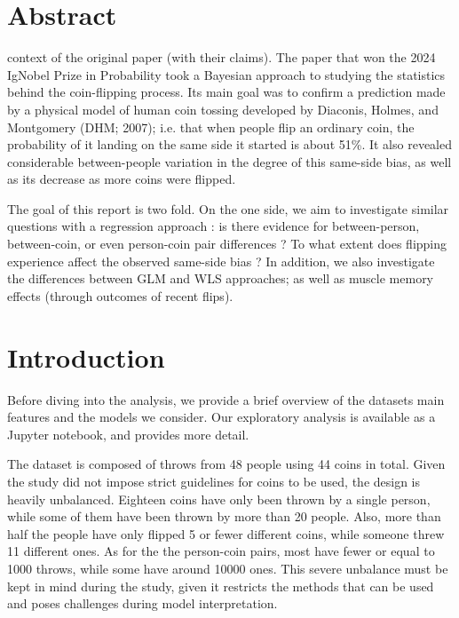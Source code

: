 \documentclass[a4paper, 12pt,oneside]{article}
\begin{document}
 
	 
	\clearpage
	\tableofcontents
	\thispagestyle{empty}
	\vspace{2cm}
	\section*{Abstract}
		context of the original paper (with their claims). The paper that won the 2024 IgNobel Prize in Probability took a Bayesian approach to studying the statistics behind the coin-flipping process. Its main goal was to confirm a prediction made by a physical model of human coin tossing developed by Diaconis, Holmes, and Montgomery (DHM; 2007); i.e. that when people flip an ordinary coin, the probability of it landing on the same side it started is about 51\%. 
		It also revealed considerable between-people variation in the degree of this same-side bias, as well as its decrease as more coins were flipped. 

		The goal of this report is two fold. On the one side, we aim to investigate similar questions with a regression approach : 
		is there evidence for between-person, between-coin, or even person-coin pair differences ? To what extent does flipping experience affect the observed same-side bias ?
		In addition, we also investigate the differences between GLM and WLS approaches; as well as muscle memory effects (through outcomes of recent flips). 
	\clearpage
	\setcounter{page}{1}
	\section{Introduction}
		Before diving into the analysis, we provide a brief overview of the datasets main features and the models we consider. Our exploratory analysis is available as a Jupyter notebook, and provides more detail. 

		The dataset is composed of throws from 48 people using 44 coins in total. Given the study did not impose strict guidelines for coins to be used, the design is heavily unbalanced. Eighteen coins have only been thrown by a single person, while some of them have been thrown by more than 20 people. Also, more than half the people have only flipped 5 or fewer different coins, while someone threw 11 different ones. As for the the person-coin pairs, most have fewer or equal to 1000 throws, while some have around 10000 ones. This severe unbalance must be kept in mind during the study, given it restricts the methods that can be used and poses challenges during model interpretation. 
\end{document}
